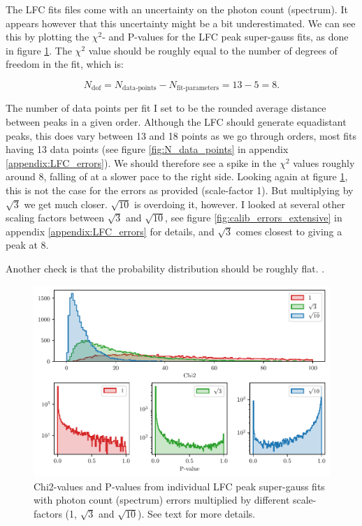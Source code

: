     The LFC fits files come with an uncertainty on the photon count (spectrum). It appears however that this uncertainty might be a bit underestimated. We can see this by plotting the $\chi^2$- and P-values for the LFC peak super-gauss fits, as done in figure \ref{fig:calib_errors}. The $\chi^2$ value should be roughly equal to the number of degrees of freedom in the fit, which is: 

    \begin{equation}
        \label{eq:ndof}
        N_\text{dof} = N_\text{data-points} - N_\text{fit-parameters} =  13 - 5 = 8.
    \end{equation}

    The number of data points per fit I set to be the rounded average distance between peaks in a given order. Although the LFC should generate equadistant peaks, this does vary between 13 and 18 points as we go through orders, most fits having 13 data points (see figure \ref{fig:N_data_points} in appendix \ref{appendix:LFC_errors}). We should therefore see a spike in the $\chi^2$ values roughly around 8, falling of at a slower pace to the right side. Looking again at figure \ref{fig:calib_errors}, this is not the case for the errors as provided (scale-factor 1). But multiplying by $\sqrt{3}$ we get much closer. $\sqrt{10}$ is overdoing it, however. I looked at several other scaling factors between $\sqrt{3}$ and $\sqrt{10}$, see figure \ref{fig:calib_errors_extensive} in appendix \ref{appendix:LFC_errors} for details, and $\sqrt{3}$ comes closest to giving a peak at 8.
    
    Another check is that the probability distribution should be roughly flat. .
    
    \begin{figure}%
        \begin{wide}  
            \includegraphics[width=\textwidth]{figures/calib_errors2.pdf}
            \caption{Chi2-values and P-values from individual LFC peak super-gauss fits with photon count (spectrum) errors multiplied by different scale-factors (1, $\sqrt{3}$ and $\sqrt{10}$). See text for more details.}
        \label{fig:calib_errors}
        \end{wide}
    \end{figure}
    

